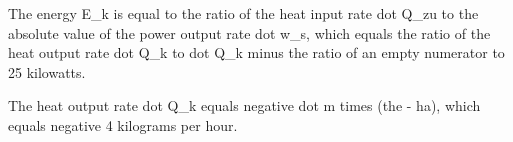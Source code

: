 The energy E_k is equal to the ratio of the heat input rate dot Q_zu to the absolute value of the power output rate dot w_s, which equals the ratio of the heat output rate dot Q_k to dot Q_k minus the ratio of an empty numerator to 25 kilowatts.

The heat output rate dot Q_k equals negative dot m times (the - ha), which equals negative 4 kilograms per hour.